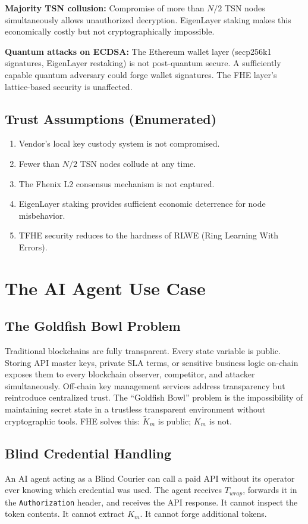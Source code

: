 \documentclass[conference]{IEEEtran}
\begin{document}
\textbf{Majority TSN collusion:} Compromise of more than $N/2$ TSN nodes simultaneously
allows unauthorized decryption. EigenLayer staking makes this economically costly but
not cryptographically impossible.

\textbf{Quantum attacks on ECDSA:} The Ethereum wallet layer (secp256k1 signatures,
EigenLayer restaking) is not post-quantum secure. A sufficiently capable quantum
adversary could forge wallet signatures. The FHE layer's lattice-based security
is unaffected.

\subsection{Trust Assumptions (Enumerated)}
\begin{enumerate}
\item Vendor's local key custody system is not compromised.
\item Fewer than $N/2$ TSN nodes collude at any time.
\item The Fhenix L2 consensus mechanism is not captured.
\item EigenLayer staking provides sufficient economic deterrence for node misbehavior.
\item TFHE security reduces to the hardness of RLWE (Ring Learning With Errors).
\end{enumerate}

\section{The AI Agent Use Case}
\label{sec:agent}

\subsection{The Goldfish Bowl Problem}
Traditional blockchains are fully transparent. Every state variable is public. Storing
API master keys, private SLA terms, or sensitive business logic on-chain exposes them
to every blockchain observer, competitor, and attacker simultaneously. Off-chain key
management services address transparency but reintroduce centralized trust. The
``Goldfish Bowl'' problem is the impossibility of maintaining secret state in a
trustless transparent environment without cryptographic tools. FHE solves this:
$\tilde{K}_m$ is public; $K_m$ is not.

\subsection{Blind Credential Handling}
An AI agent acting as a Blind Courier can call a paid API without its operator ever
knowing which credential was used. The agent receives $T_{wrap}$, forwards it in the
\texttt{Authorization} header, and receives the API response. It cannot inspect the
token contents. It cannot extract $K_m$. It cannot forge additional tokens.
\end{document}
